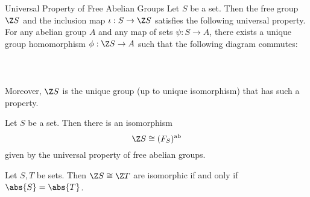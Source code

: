 \documentclass[a4paper]{article}
\begin{document}
\begin{prp}{Universal Property of Free Abelian Groups}{} Let $S$ be a set. Then the free group $\Z S$ and the inclusion map $\iota:S\to\Z S$ satisfies the following universal property. For any abelian group $A$ and any map of sets $\psi:S\to A$, there exists a unique group homomorphism $\phi:\Z S\to A$ such that the following diagram commutes: \\~\\
 \\~\\
Moreover, $\Z S$ is the unique group (up to unique isomorphism) that has such a property. \tcbline
\end{prp}

\begin{prp}{}{} Let $S$ be a set. Then there is an isomorphism $$\Z S\cong(F_S)^\text{ab}$$ given by the universal property of free abelian groups. 
\end{prp}

\begin{prp}{}{} Let $S,T$ be sets. Then $\Z S\cong\Z T$ are isomorphic if and only if $\abs{S}=\abs{T}$. 
\end{prp}
\end{document}
